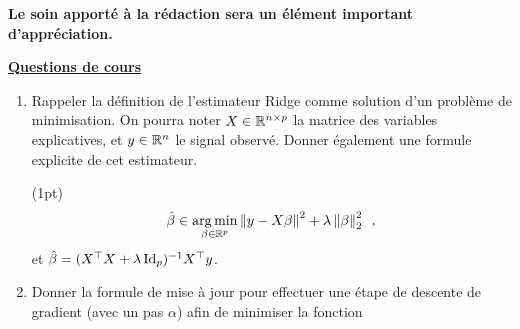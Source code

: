 \documentclass[a4paper,11pt,twoside]{exam}
\begin{document}
\sloppy
\myheader

\begin{center}
\textbf{Le soin apporté à la rédaction sera un élément important d'appréciation.}
\end{center}
\begin{center}
\bigskip
\underline{\large \textbf{Questions de cours}} %
\end{center}

\begin{enumerate}[label=QdC - \arabic*.]
    \item Rappeler la définition de l'estimateur Ridge comme solution d'un problème de minimisation.
    On pourra noter $X \in \mathbb{R}^{n\times p}$ la matrice des variables explicatives, et $y\in \mathbb{R}^n$ le signal observé.
    Donner également une formule explicite de cet estimateur.

    \begin{solution}(1pt)
    \begin{align*}
        \hat\beta \in \mathop{\mathrm{arg\,min}}_{\beta \in \mathbb{R}^p} \left \lVert y - X \beta \right \rVert^2 + \lambda \left \lVert \beta \right \rVert^2_2\enspace,
    \end{align*} et $\hat\beta = (X^\top X + \lambda \operatorname{Id}_p)^{-1} X^\top y$.
    \end{solution}
    \item Donner la formule de mise à jour pour effectuer une étape de descente de gradient (avec un pas $\alpha$) afin de minimiser la fonction
\end{enumerate}
\end{document}
